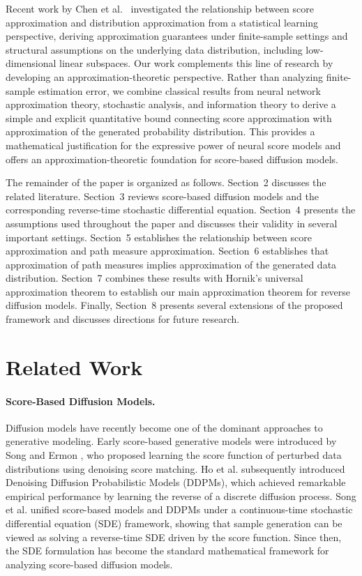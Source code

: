 \documentclass[11pt]{article}
\begin{document}
Recent work by Chen et al.~\cite{Chen2023ScoreAE} investigated the relationship
between score approximation and distribution approximation from a statistical
learning perspective, deriving approximation guarantees under finite-sample
settings and structural assumptions on the underlying data distribution,
including low-dimensional linear subspaces. Our work complements this line of
research by developing an approximation-theoretic perspective. Rather than
analyzing finite-sample estimation error, we combine classical results from
neural network approximation theory, stochastic analysis, and information
theory to derive a simple and explicit quantitative bound connecting score
approximation with approximation of the generated probability distribution.
This provides a mathematical justification for the expressive power of neural
score models and offers an approximation-theoretic foundation for score-based
diffusion models.



The remainder of the paper is organized as follows.
Section~2 discusses the related literature.
Section~3 reviews score-based diffusion models and the corresponding
reverse-time stochastic differential equation.
Section~4 presents the assumptions used throughout the paper and discusses
their validity in several important settings.
Section~5 establishes the relationship between score approximation and
path measure approximation.
Section~6 establishes that approximation of path measures implies
approximation of the generated data distribution.
Section~7 combines these results with Hornik's universal approximation
theorem to establish our main approximation theorem for reverse diffusion
models.
Finally, Section~8 presents several extensions of the proposed framework
and discusses directions for future research.

\section{Related Work}

\paragraph{Score-Based Diffusion Models.}
Diffusion models have recently become one of the dominant approaches to
generative modeling. Early score-based generative models were introduced by
Song and Ermon \cite{SongErmon2019}, who proposed learning the score function
of perturbed data distributions using denoising score matching. Ho et al.
\cite{Ho2020} subsequently introduced Denoising Diffusion Probabilistic Models
(DDPMs), which achieved remarkable empirical performance by learning the reverse
of a discrete diffusion process. Song et al. \cite{Song2021} unified score-based
models and DDPMs under a continuous-time stochastic differential equation (SDE)
framework, showing that sample generation can be viewed as solving a reverse-time
SDE driven by the score function. Since then, the SDE formulation has become the
standard mathematical framework for analyzing score-based diffusion models.
\end{document}
